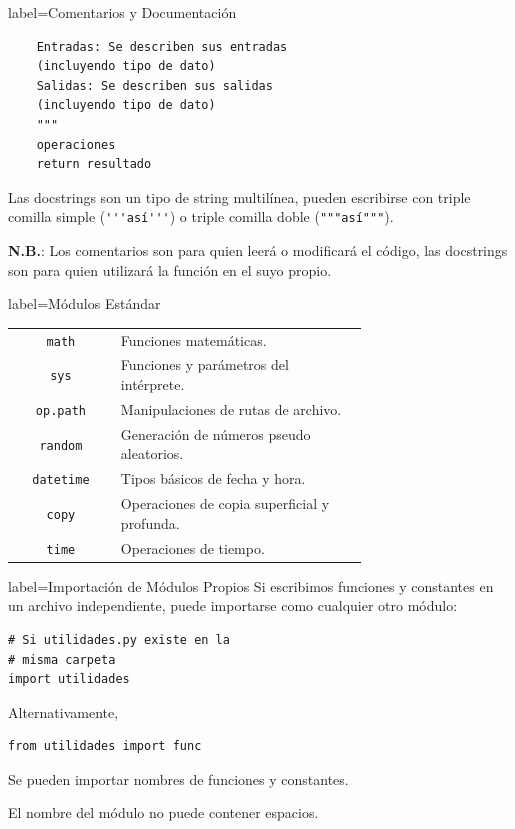 \documentclass[10pt]{article}
\begin{document}
\begin{multicols*}{3}
\begin{contentbox}{label=Comentarios y Documentación}
\begin{lstlisting}
    Entradas: Se describen sus entradas 
    (incluyendo tipo de dato)
    Salidas: Se describen sus salidas 
    (incluyendo tipo de dato)
    """
    operaciones
    return resultado
\end{lstlisting}

    Las docstrings son un tipo de string multilínea, pueden escribirse con triple comilla simple (\lstinline!'''así'''!) o triple comilla doble (\lstinline!"""así"""!).
    
    \textbf{N.B.}: Los comentarios son para quien leerá o modificará el código, las docstrings son para quien utilizará la función en el suyo propio.
\end{contentbox}

\begin{contentbox}{label=Módulos Estándar}
    \small
    \begin{tabular}{C|p{0.7\linewidth}}
        \lstinline!math! & Funciones matemáticas. \\
        \lstinline!sys! & Funciones y parámetros del intérprete. \\
        \lstinline!op.path! & Manipulaciones de rutas de archivo. \\
        \lstinline!random! & Generación de números pseudo aleatorios. \\
        \lstinline!datetime! & Tipos básicos de fecha y hora. \\
        \lstinline!copy! & Operaciones de copia superficial y profunda. \\
        \lstinline!time! & Operaciones de tiempo. \\
    \end{tabular}
\end{contentbox}

\begin{contentbox}{label=Importación de Módulos Propios}
    Si escribimos funciones y constantes en un archivo independiente, puede importarse como cualquier otro módulo:
\begin{lstlisting}
# Si utilidades.py existe en la
# misma carpeta
import utilidades
\end{lstlisting}

Alternativamente,
\begin{lstlisting}
from utilidades import func
\end{lstlisting}
    
    Se pueden importar nombres de funciones y constantes.
    
    El nombre del módulo no puede contener espacios.
\end{contentbox}


\end{multicols*}
\end{document}
